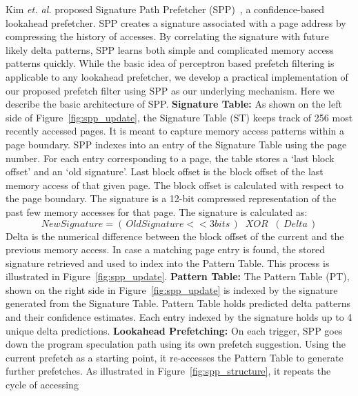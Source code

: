 Kim {\em et. al.} proposed Signature Path Prefetcher (SPP)~\cite{SPP},
a confidence-based lookahead prefetcher.  SPP creates a signature
associated with a page address by compressing the history of
accesses. By correlating the signature with future likely delta
patterns, SPP learns both simple and complicated memory access
patterns quickly.  While the basic idea of perceptron based prefetch
filtering is applicable to any lookahead prefetcher, we develop a
practical implementation of our proposed prefetch filter
using SPP as our underlying mechanism. 
Here we describe the basic architecture of SPP.
\newline
\newline
\noindent \textbf{Signature Table:} As shown on the left side of
Figure~\ref{fig:spp_update}, the Signature Table (ST) keeps track of 256
most recently accessed pages. It is meant to capture memory access
patterns within a page boundary. SPP indexes into an entry of the
Signature Table using the page number. For each entry corresponding to
a page, the table stores a `last block offset' and an `old
signature'. Last block offset is the block offset of the last memory
access of that given page. The block offset is calculated with respect
to the page boundary. The signature is a 12-bit compressed
representation of the past few memory accesses for that page. The
signature is calculated as:
$$New Signature = (\,Old Signature << 3 bits\,) \;\;XOR\;\;
(\,Delta\,)$$ Delta is the numerical difference between the block
offset of the current and the previous memory access. In case a
matching page entry is found, the stored signature retrieved and used
to index into the Pattern Table.  This process is illustrated in
Figure~\ref{fig:spp_update}.
\newline
\newline
\noindent \textbf{Pattern Table:} The Pattern Table (PT), shown on the right
side in Figure~\ref{fig:spp_update} is indexed by the signature
generated from the Signature Table.  Pattern Table holds predicted
delta patterns and their confidence estimates. Each entry indexed by
the signature holds up to 4 unique delta predictions.
%
\newline
\newline
\noindent \textbf{Lookahead Prefetching:} On each trigger, SPP goes
down the program speculation path using its own prefetch suggestion.
Using the current prefetch as a starting point, it re-accesses the Pattern
Table to generate further prefetches.  As illustrated in
Figure~\ref{fig:spp_structure}, it repeats the cycle of accessing
